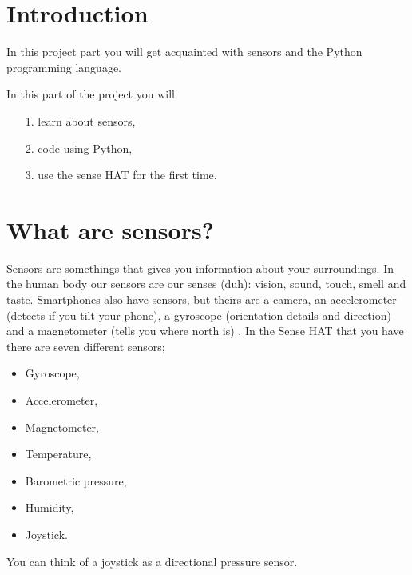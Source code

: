 \documentclass{article}
\begin{document}
\section{Introduction}
\noindent In this project part you will get acquainted with sensors and the Python programming language.

\noindent In this part of the project you will
\begin{itemize}
\item[1.] learn about sensors,
\item[2.] code using Python,
\item[3.] use the sense HAT for the first time.
\end{itemize}

\section{What are sensors?}
Sensors are somethings that gives you information about your surroundings. In the human body our sensors are our senses (duh): vision, sound, touch, smell and taste. Smartphones also have sensors, but theirs are a camera, an accelerometer (detects if you tilt your phone), a gyroscope (orientation details and direction) and a magnetometer (tells you where north is) \cite{foss}. In the Sense HAT that you have there are seven different sensors;
\begin{itemize}
    \item Gyroscope,
    \item Accelerometer,
    \item Magnetometer,
    \item Temperature,
    \item Barometric pressure,
    \item Humidity,
    \item Joystick.
\end{itemize}
You can think of a joystick as a directional pressure sensor.
\end{document}
